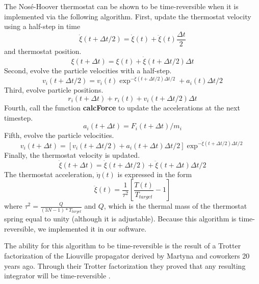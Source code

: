 \documentclass[12pt]{article}
\begin{document}
The Nos\'{e}-Hoover thermostat can be shown to be time-reversible when it is implemented via the following algorithm.
First, update the thermostat velocity using a half-step in time
\begin{equation}
\dot{\xi} (t+ \Delta t/2) = \dot{\xi}(t) + \ddot{\xi}(t) \frac{\Delta t}{2}
\end{equation}
and thermostat position.
\begin{equation}
\xi (t+ \Delta t) = \xi(t) + \dot{\xi}(t+\Delta t/2)\Delta t
\end{equation}
Second, evolve the particle velocities with a half-step.
\begin{equation}
v_i (t+\Delta t/2) = v_i (t) \exp^{-\dot{\xi}(t+\Delta t/2) \Delta t/2} + a_{i} (t) \Delta t/2
\end{equation}
Third, evolve particle positions.
\begin{equation}
r_{i} (t+\Delta t) + r_{i} (t) + v_{i}(t+ \Delta t/2) \Delta t
\end{equation}
Fourth, call the function \textbf{calcForce} to update the accelerations at the next timestep.
\begin{equation}
a_{i} (t+\Delta t) = F_{i} (t+ \Delta t)/m_{i}
\end{equation}
Fifth, evolve the particle velocities.
\begin{equation}
v_{i} (t+ \Delta t)  = [v_{i}(t+\Delta t/2) + a_{i}(t+\Delta t) \Delta t/2]\exp^{-\dot{\xi}(t+\Delta t/2) \Delta t/2}
\end{equation}
Finally, the thermostat velocity is updated.
\begin{equation}
\dot{\xi}(t+\Delta t) = \dot{\xi} (t+\Delta t/2) + \ddot{\xi} (t+\Delta t) \Delta t /2
\end{equation}
The thermostat acceleration, $\ddot{\eta}(t)$ is expressed in the form
\begin{equation}
\ddot{\xi}(t) = \frac{1}{\tau^{2}} [\frac{T(t)}{T_{target}} -1 ]
\end{equation}
where $\tau^{2} = \frac{Q}{(3N-1)*T_{target}}$ and $Q$, which is the thermal mass of the thermostat spring equal to unity (although it is adjustable).
Because this algorithm is time-reversible, we implemented it in our software.

The ability for this algorithm to be time-reversible is the result of a Trotter factorization of the Liouville propagator derived by Martyna and coworkers 20 years ago. Through their Trotter factorization they proved that any resulting integrator will be time-reversible \cite{Tuckerman1992}.
\end{document}
